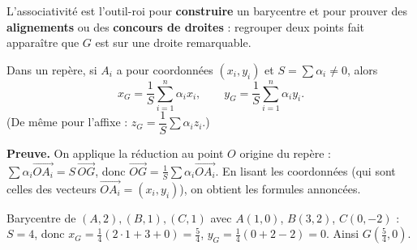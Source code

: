 \begin{aretenir}
L'associativité est l'outil-roi pour \textbf{construire} un barycentre et pour prouver des \textbf{alignements} ou des \textbf{concours de droites} : regrouper deux points fait apparaître que $G$ est sur une droite remarquable.
\end{aretenir}

\begin{propriete}
Dans un repère, si $A_i$ a pour coordonnées $(x_i,y_i)$ et $S=\sum\alpha_i\neq0$, alors
\[
x_G=\frac{1}{S}\sum_{i=1}^{n}\alpha_i x_i,\qquad
y_G=\frac{1}{S}\sum_{i=1}^{n}\alpha_i y_i.
\]
(De même pour l'affixe : $z_G=\dfrac1S\sum\alpha_i z_i$.)
\end{propriete}

\begin{remarque}
\textbf{Preuve.} On applique la réduction au point $O$ origine du repère :
$\sum\alpha_i\overrightarrow{OA_i}=S\,\overrightarrow{OG}$, donc
$\overrightarrow{OG}=\frac1S\sum\alpha_i\overrightarrow{OA_i}$. En lisant les coordonnées (qui sont
celles des vecteurs $\overrightarrow{OA_i}=(x_i,y_i)$), on obtient les formules annoncées.
\end{remarque}

\begin{exemple}
Barycentre de $(A,2),(B,1),(C,1)$ avec $A(1,0)$, $B(3,2)$, $C(0,-2)$ : $S=4$, donc
$x_G=\frac14(2\cdot1+3+0)=\frac54$, $y_G=\frac14(0+2-2)=0$. Ainsi $G\!\left(\frac54,0\right)$.
\end{exemple}

\begin{illus}
\end{illus}

